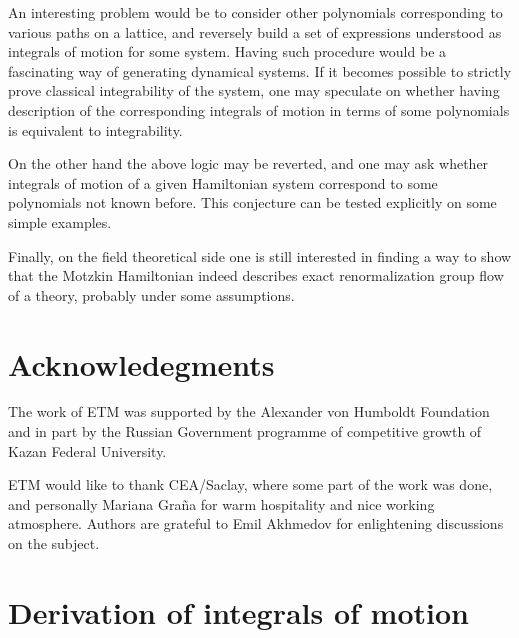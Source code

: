 \documentclass[12pt]{article}%
\numberwithin{equation}{section}
\begin{document}
An interesting problem would be to consider other polynomials corresponding to various paths on a lattice, and reversely build a set of expressions understood as integrals of motion for some system. Having such procedure would be a fascinating way of generating dynamical systems. If it becomes possible to strictly prove classical integrability of the system, one may speculate on whether having description of the corresponding integrals of motion in terms of some polynomials is equivalent to integrability. 

On the other hand the above logic may be reverted, and one may ask whether integrals of motion of a given Hamiltonian system correspond to some polynomials not known before. This conjecture can be tested explicitly on some simple examples. 

Finally, on the field theoretical side one is still interested in finding a way to show that the Motzkin Hamiltonian indeed describes exact renormalization group flow of a theory, probably under some assumptions. 


\section*{Acknowledegments}

The work of ETM was supported by the Alexander von Humboldt Foundation and in part by the Russian Government programme of competitive growth of Kazan Federal University. 

ETM would like to thank CEA/Saclay, where some part of the work was done, and personally Mariana Gra\~na  for warm hospitality and nice working atmosphere. Authors are grateful to Emil Akhmedov for
enlightening discussions on the subject.

\appendix



\section{Derivation of integrals of motion}
\label{deriv1}
\end{document}
